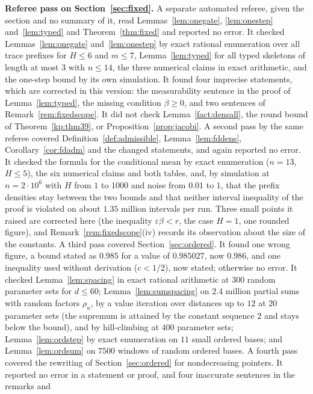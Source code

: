 \documentclass[11pt]{amsart}
\theoremstyle{definition}
\theoremstyle{remark}
\newcommand{\eps}{\varepsilon}
\begin{document}
\medskip\noindent\textbf{Referee pass on Section~\ref{sec:fixed}.} A separate automated referee,
given the section and no summary of it, read Lemmas~\ref{lem:onegate}, \ref{lem:onestep}
and~\ref{lem:typed} and Theorem~\ref{thm:fixed} and reported no error. It checked
Lemmas~\ref{lem:onegate} and~\ref{lem:onestep} by exact rational enumeration over all trace
prefixes for $H\le6$ and $m\le7$, Lemma~\ref{lem:typed} for all typed skeletons of length at
most $3$ with $n\le14$, the three numerical claims in exact arithmetic, and the one-step bound by
its own simulation. It found four imprecise statements, which are corrected in this version:
the measurability sentence in the proof of Lemma~\ref{lem:typed}, the missing condition
$\beta\ge0$, and two sentences of Remark~\ref{rem:fixedscope}. It did not check
Lemma~\ref{fact:densall}, the round bound of Theorem~\ref{kp:thm39}, or Proposition~\ref{prop:jacobi}.
A second pass by the same referee covered Definition~\ref{def:admissible},
Lemma~\ref{lem:fddens}, Corollary~\ref{cor:fdadm} and the changed statements, and again
reported no error. It checked the formula for the conditional mean by exact enumeration
($n=13$, $H\le5$), the six numerical claims and both tables, and, by simulation at
$n=2\cdot10^6$ with $H$ from $1$ to $1000$ and noise from $0.01$ to $1$, that the prefix
densities stay between the two bounds and that neither interval inequality of the proof is
violated on about $1.35$ million intervals per run. Three small points it raised are corrected
here (the inequality $\eps\beta<r$, the case $H=1$, one rounded figure), and
Remark~\ref{rem:fixedscope}(iv) records its observation about the size of the constants.
A third pass covered Section~\ref{sec:ordered}. It found one wrong figure, a bound stated as
$0.985$ for a value of $0.985027$, now $0.986$, and one inequality used without derivation
($c<1/2$), now stated; otherwise no error. It checked Lemma~\ref{lem:spacing} in exact
rational arithmetic at $300$ random parameter sets for $d\le60$; Lemma~\ref{lem:sumspacing} on
$2.4$ million partial sums with random factors $\rho_u$, by a value iteration over distances up
to $12$ at $20$ parameter sets (the supremum is attained by the constant sequence $2$ and stays
below the bound), and by hill-climbing at $400$ parameter sets; Lemma~\ref{lem:ordstep} by exact
enumeration on $11$ small ordered bases; and Lemma~\ref{lem:ordsum} on $7500$ windows of random
ordered bases.
A fourth pass covered the rewriting of Section~\ref{sec:ordered} for nondecreasing pointers. It
reported no error in a statement or proof, and four inaccurate sentences in the remarks and
\end{document}
